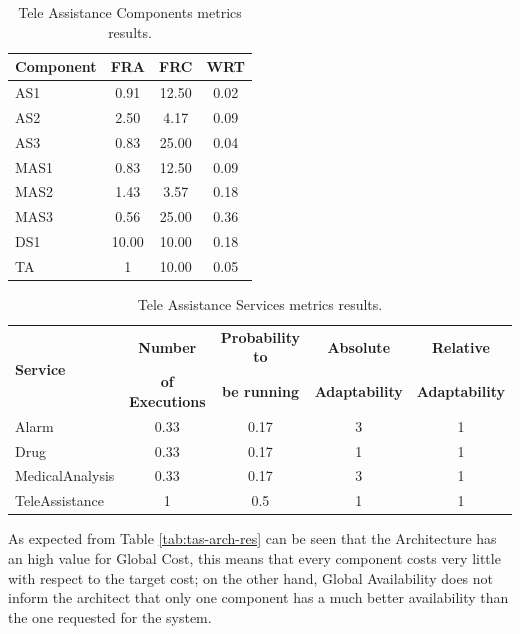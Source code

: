 \begin{table}[ht!b]
	\centering
	\begin{tabular}{|l|c|c|c|}
		\hline 
		\textbf{Component} & \textbf{FRA} & \textbf{FRC} & \textbf{WRT} \\ 
		\hline 
		AS1 & 0.91 & 12.50 & 0.02 \\
		\hline 
		AS2 & 2.50 & 4.17 & 0.09 \\
		\hline 
		AS3 & 0.83 & 25.00 & 0.04 \\
		\hline 
		MAS1 & 0.83 & 12.50 & 0.09 \\
		\hline
		MAS2 & 1.43 & 3.57 & 0.18 \\
		\hline
		MAS3 & 0.56 & 25.00 & 0.36 \\
		\hline
		DS1 & 10.00 & 10.00 & 0.18 \\
		\hline
		TA & 1 & 10.00 & 0.05 \\
		\hline
	\end{tabular} 
	\caption[TAS Service Components Metrics]{Tele Assistance Components metrics results.}
	\label{tab:tas-comp-res}
\end{table}

\begin{table}[ht!b]
	\centering
	\begin{tabular}{|l|c|c|c|c|}
		\hline 
		\multirow{2}{*}{\textbf{Service}} & \textbf{Number} & \textbf{Probability to} & \textbf{Absolute} & \textbf{Relative} \\ 
		& \textbf{of Executions} & \textbf{be running} & \textbf{Adaptability} & \textbf{Adaptability} \\
		\hline 
		Alarm & 0.33 & 0.17 & 3 & 1 \\
		\hline 
		Drug & 0.33 & 0.17 & 1 & 1 \\
		\hline 
		MedicalAnalysis & 0.33 & 0.17 & 3 & 1 \\
		\hline 
		TeleAssistance & 1 & 0.5 & 1 & 1 \\
		\hline
	\end{tabular} 
	\caption[TAS Service Services Metrics]{Tele Assistance Services metrics results.}
	\label{tab:tas-serv-res}
\end{table}

As expected from Table \ref{tab:tas-arch-res} can be seen that the Architecture has an high value for Global Cost, this means that every component costs very little with respect to the target cost; on the other hand, Global Availability does not inform the architect that only one component has a much better availability than the one requested for the system. 

